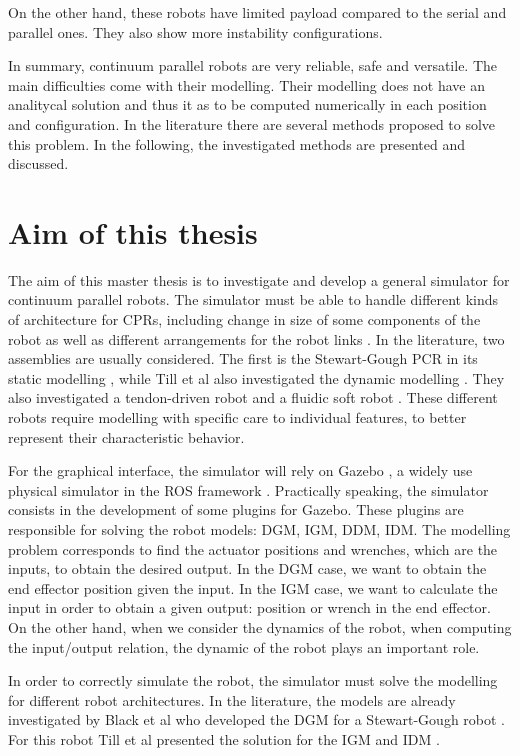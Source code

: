 \documentclass{thesisreport}
\begin{document}
 On the other hand, these robots have limited payload compared to the serial and parallel ones. They also show more instability configurations.
 
 In summary, continuum parallel robots are very reliable, safe and versatile. The main difficulties come with their modelling. Their modelling does not have an analitycal solution and thus it as to be computed numerically in each position and configuration. In the literature there are several methods proposed to solve this problem. In the following, the investigated methods are presented and discussed.
 
 \section{Aim of this thesis}
 The aim of this master thesis is to investigate and develop a general simulator for continuum parallel robots. The simulator must be able to handle different kinds of architecture for CPRs, including change in size of some components of the robot as well as different arrangements for the robot links \cite{bryson_toward_2014}. In the literature, two assemblies are usually considered. The first is the Stewart-Gough PCR in its static modelling \cite{till_efficient_2015}\cite{black_parallel_2018}, while Till et al also investigated the dynamic modelling \cite{till_real-time_2019}. They also investigated a tendon-driven robot and a fluidic soft robot \cite{till_real-time_2019}. These different robots require modelling with specific care to individual features, to better represent their characteristic behavior. 
 
 For the graphical interface, the simulator will rely on Gazebo \cite{koenig_design_2004}\cite{noauthor_gazebo_nodate}, a widely use physical simulator in the ROS framework \cite{noauthor_rosorg_nodate}. Practically speaking, the simulator consists in the development of some plugins for Gazebo. These plugins are responsible for solving the robot models: DGM, IGM, DDM, IDM.
  The modelling problem corresponds to find the actuator positions and wrenches, which are the inputs, to obtain the desired output. In the DGM case, we want to obtain the end effector position given the input. In the IGM case, we want to calculate the input in order to obtain a given output: position or wrench in the end effector. On the other hand, when we consider the dynamics of the robot, when computing the input/output relation, the dynamic of the robot plays an important role. 
 
 In order to correctly simulate the robot, the simulator must solve the modelling for different robot architectures. In the literature, the models are already investigated by Black et al who developed the DGM for a Stewart-Gough robot \cite{black_parallel_2018}. For this robot Till et al presented the solution for the IGM \cite{till_real-time_2019} and IDM \cite{till_efficient_2015}.
 
\end{document}
